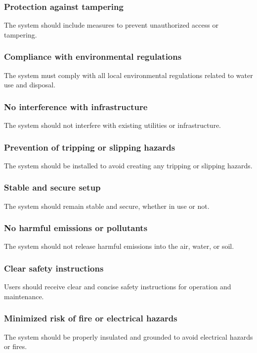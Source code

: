 \documentclass[12pt]{report}
\begin{document}
\subsubsection{Protection against tampering}
The system should include measures to prevent unauthorized access or tampering.

\subsubsection{Compliance with environmental regulations}
The system must comply with all local environmental regulations related to water use and disposal.

\subsubsection{No interference with infrastructure}
The system should not interfere with existing utilities or infrastructure.

\subsubsection{Prevention of tripping or slipping hazards}
The system should be installed to avoid creating any tripping or slipping hazards.

\subsubsection{Stable and secure setup}
The system should remain stable and secure, whether in use or not.

\subsubsection{No harmful emissions or pollutants}
The system should not release harmful emissions into the air, water, or soil.

\subsubsection{Clear safety instructions}
Users should receive clear and concise safety instructions for operation and maintenance.

\subsubsection{Minimized risk of fire or electrical hazards}
The system should be properly insulated and grounded to avoid electrical hazards or fires.
\end{document}
